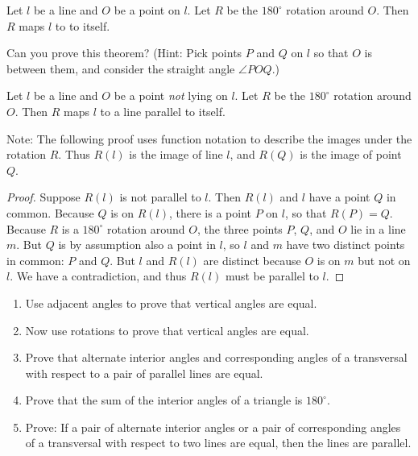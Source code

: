 \begin{theorem}
Let $l$ be a line and $O$ be a point on $l$. Let $R$ be the $180^\circ$
rotation around $O$. Then $R$ maps $l$ to to itself.  
\end{theorem}

\begin{question}
Can you prove this theorem?  
(Hint:  Pick points $P$ and $Q$ on $l$ so that $O$ is between them, and consider the straight angle $\angle POQ$.)
\end{question}
\QM

\begin{theorem}
Let $l$ be a line and $O$ be a point \emph{not} lying on $l$. Let $R$ be the $180^\circ$
rotation around $O$. Then $R$ maps $l$ to a line parallel to itself. 
\end{theorem}

Note:  The following proof uses function notation to describe the images under the rotation $R$.  Thus $R(l)$ is the image of line $l$, and $R(Q)$ is the image of point $Q$.  


\begin{proof}
Suppose $R(l)$ is not parallel to $l$.  Then $R(l)$ and $l$ have a point $Q$ in common.  Because $Q$ is on $R(l)$, there is a point $P$ on $l$, 
so that $R(P) = Q$. Because $R$ is a $180^\circ$ rotation around $O$, the three points $P$, $Q$, and $O$ lie in a line $m$. But
$Q$ is by assumption also a point in $l$, so $l$ and $m$  have two distinct points in common: $P$ and $Q$. 
But $l$ and $R(l)$ are distinct because $O$ is on $m$ but not on $l$. We have a contradiction, and thus $R(l)$ must be parallel to $l$.  
\end{proof}

%
%
%


\begin{problems}
\begin{enumerate}
\item Use adjacent angles to prove that vertical angles are equal.    
\item Now use rotations to prove that vertical angles are equal.

\item Prove that alternate interior angles and corresponding angles of a transversal with respect to a pair of parallel lines are equal.
\item Prove that the sum of the interior angles of a triangle is $180^\circ$.
\item Prove: If a pair of alternate interior angles or a pair of corresponding angles of a transversal with respect to two lines are equal, then the lines are parallel.
\end{enumerate}
\end{problems}


